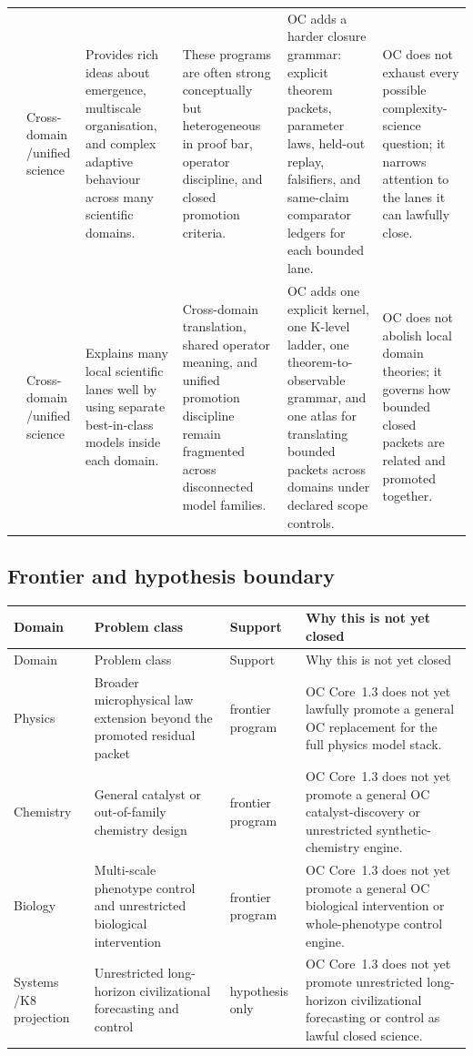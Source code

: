 \begin{longtable}{@{}L{0.17\textwidth}L{0.09\textwidth}L{0.17\textwidth}L{0.17\textwidth}L{0.20\textwidth}L{0.14\textwidth}@{}}
 & Cross-domain /\allowbreak unified science & Provides rich ideas about emergence, multiscale organisation, and complex adaptive behaviour across many scientific domains. & These programs are often strong conceptually but heterogeneous in proof bar, operator discipline, and closed promotion criteria. & OC adds a harder closure grammar: explicit theorem packets, parameter laws, held-out replay, falsifiers, and same-claim comparator ledgers for each bounded lane. & OC does not exhaust every possible complexity-science question; it narrows attention to the lanes it can lawfully close. \\
 & Cross-domain /\allowbreak unified science & Explains many local scientific lanes well by using separate best-in-class models inside each domain. & Cross-domain translation, shared operator meaning, and unified promotion discipline remain fragmented across disconnected model families. & OC adds one explicit kernel, one K-level ladder, one theorem-to-observable grammar, and one atlas for translating bounded packets across domains under declared scope controls. & OC does not abolish local domain theories; it governs how bounded closed packets are related and promoted together. \\
\bottomrule
\end{longtable}

\subsection{Frontier and hypothesis boundary}
\begin{longtable}{@{}L{0.11\textwidth}L{0.19\textwidth}L{0.14\textwidth}L{0.48\textwidth}@{}}
\toprule
Domain & Problem class & Support & Why this is not yet closed \\
\midrule
\endfirsthead
\toprule
Domain & Problem class & Support & Why this is not yet closed \\
\midrule
\endhead
Physics & Broader microphysical law extension beyond the promoted residual packet & frontier program & OC Core~1.3 does not yet lawfully promote a general OC replacement for the full physics model stack. \\
Chemistry & General catalyst or out-of-family chemistry design & frontier program & OC Core~1.3 does not yet promote a general OC catalyst-discovery or unrestricted synthetic-chemistry engine. \\
Biology & Multi-scale phenotype control and unrestricted biological intervention & frontier program & OC Core~1.3 does not yet promote a general OC biological intervention or whole-phenotype control engine. \\
Systems /\allowbreak K8 projection & Unrestricted long-horizon civilizational forecasting and control & hypothesis only & OC Core~1.3 does not yet promote unrestricted long-horizon civilizational forecasting or control as lawful closed science. \\
\bottomrule
\end{longtable}
\endgroup
